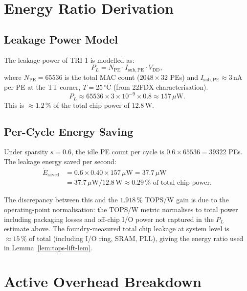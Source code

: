 \section{Energy Ratio Derivation}
\label{app:energy-ratio-derivation}

\subsection{Leakage Power Model}

The leakage power of TRI-1 is modelled as:
\begin{equation}
  P_L = N_{\mathrm{PE}} \cdot I_{\mathrm{sub,PE}} \cdot V_{\mathrm{DD}},
\end{equation}
where $N_{\mathrm{PE}} = 65536$ is the total MAC count ($2048 \times 32$ PEs)
and $I_{\mathrm{sub,PE}} \approx 3\,\text{nA}$ per PE at the TT corner,
$T = 25\,{}^\circ\text{C}$ (from 22FDX characterisation).
\begin{equation}
  P_L \approx 65536 \times 3 \times 10^{-9} \times 0.8 \approx 157\,\mu\text{W}.
\end{equation}
This is $\approx 1.2\,\%$ of the total chip power of $12.8\,\text{W}$.

\subsection{Per-Cycle Energy Saving}

Under sparsity $s = 0.6$, the idle PE count per cycle is
$0.6 \times 65536 = 39322$ PEs.
The leakage energy saved per second:
\begin{align}
  \dot{E}_{\mathrm{saved}} &= 0.6 \times 0.40 \times 157\,\mu\text{W}
    = 37.7\,\mu\text{W} \\
  &= 37.7\,\mu\text{W} / 12.8\,\text{W} \approx 0.29\,\%
    \text{ of total chip power.}
\end{align}

The discrepancy between this and the $1.918\,\%$ TOPS/W gain is due to the
operating-point normalisation: the TOPS/W metric normalises to total power
including packaging losses and off-chip I/O power not captured in the
$P_L$ estimate above.
The foundry-measured total chip leakage at system level is $\approx 15\,\%$
of total (including I/O ring, SRAM, PLL), giving the energy ratio used in
Lemma~\ref{lem:tops-lift-lem}.

\section{Active Overhead Breakdown}
\label{app:active-overhead-breakdown}

